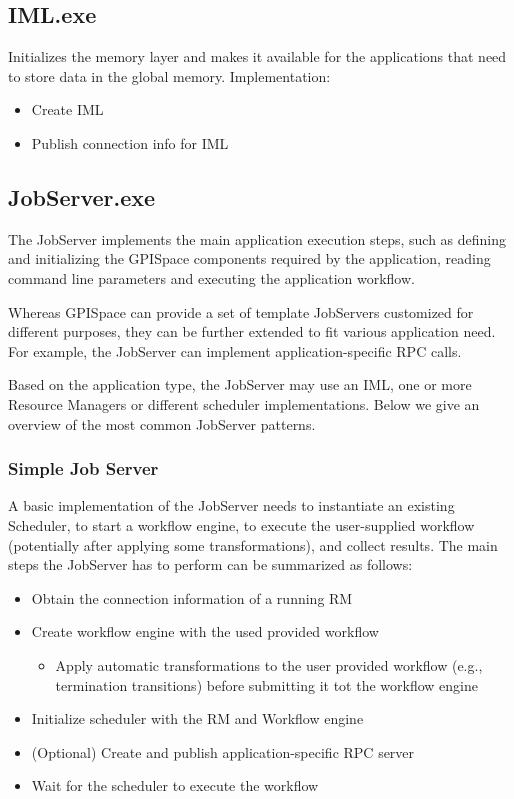 \documentclass[10pt]{article}
\newcommand{\rman}{RM\xspace}
\newcommand{\iml}{IML\xspace}
\begin{document}
\subsection{IML.exe}
Initializes the memory layer and makes it available for the applications that 
need to store data in the global memory.
Implementation:
\begin{itemize}
    \item Create \iml
    \item Publish connection info for \iml
\end{itemize}

\subsection{JobServer.exe}
The JobServer implements the main application execution steps, such as defining
and initializing the GPISpace components required by the application, reading
command line parameters and executing the application workflow.

Whereas GPISpace can provide a set of template JobServers customized for
different purposes, they can be further extended to fit various application
need. For example, the JobServer can implement application-specific RPC calls.

Based on the application type, the JobServer may use an IML, one or more
Resource Managers or different scheduler implementations. Below we give an
overview of the most common JobServer patterns.

\subsubsection{Simple Job Server}
A basic implementation of the JobServer needs to instantiate an existing
Scheduler, to start a workflow engine, to execute the user-supplied workflow
(potentially after applying some transformations), and collect results.
The main steps the JobServer has to perform can be summarized as follows:
\begin{itemize}
    \item Obtain the connection information of a running \rman
    \item Create workflow engine with the used provided workflow
    \begin{itemize}
        \item Apply automatic transformations to the user provided workflow
        (e.g., termination transitions) before submitting it tot the workflow engine
    \end{itemize}
    \item Initialize scheduler with the \rman and Workflow engine
    \item (Optional) Create and publish application-specific RPC server
    \item Wait for the scheduler to execute the workflow
\end{itemize}
\end{document}
